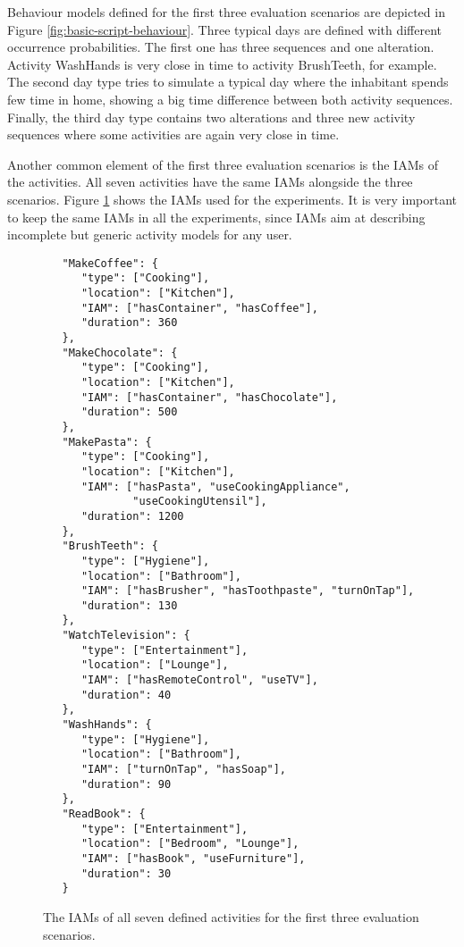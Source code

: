 Behaviour models defined for the first three evaluation scenarios are depicted in Figure \ref{fig:basic-script-behaviour}. Three typical days are defined with different occurrence probabilities. The first one has three sequences and one alteration. Activity WashHands is very close in time to activity BrushTeeth, for example. The second day type tries to simulate a typical day where the inhabitant spends few time in home, showing a big time difference between both activity sequences. Finally, the third day type contains two alterations and three new activity sequences where some activities are again very close in time.

Another common element of the first three evaluation scenarios is the IAMs of the activities. All seven activities have the same IAMs alongside the three scenarios. Figure \ref{fig:basic-iams} shows the IAMs used for the experiments. It is very important to keep the same IAMs in all the experiments, since IAMs aim at describing incomplete but generic activity models for any user.

\begin{figure}
\begin{small}
\lstset{linewidth=\textwidth}
\begin{lstlisting}
   "MakeCoffee": {
      "type": ["Cooking"],
      "location": ["Kitchen"],
      "IAM": ["hasContainer", "hasCoffee"],
      "duration": 360
   },
   "MakeChocolate": {
      "type": ["Cooking"],
      "location": ["Kitchen"],
      "IAM": ["hasContainer", "hasChocolate"],
      "duration": 500
   },
   "MakePasta": {
      "type": ["Cooking"],
      "location": ["Kitchen"],
      "IAM": ["hasPasta", "useCookingAppliance", 
              "useCookingUtensil"],
      "duration": 1200
   },
   "BrushTeeth": {
      "type": ["Hygiene"],
      "location": ["Bathroom"],
      "IAM": ["hasBrusher", "hasToothpaste", "turnOnTap"],
      "duration": 130
   },
   "WatchTelevision": {
      "type": ["Entertainment"],
      "location": ["Lounge"],
      "IAM": ["hasRemoteControl", "useTV"],
      "duration": 40
   },
   "WashHands": {
      "type": ["Hygiene"],
      "location": ["Bathroom"],
      "IAM": ["turnOnTap", "hasSoap"],
      "duration": 90
   },
   "ReadBook": {
      "type": ["Entertainment"],
      "location": ["Bedroom", "Lounge"],
      "IAM": ["hasBook", "useFurniture"],
      "duration": 30
   } 
\end{lstlisting}
\end{small}
\caption{The IAMs of all seven defined activities for the first three evaluation scenarios.}
\label{fig:basic-iams}
\end{figure}

